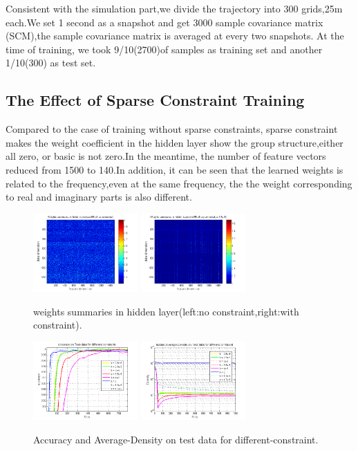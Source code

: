 Consistent with the simulation part,we divide the trajectory into 300 grids,25m each.We set 1 second as a snapshot and get 3000 sample covariance matrix (SCM),the sample covariance matrix is averaged at every two snapshots.
At the time of training, we took 9/10(2700)of samples as training set and another 1/10(300) as test set.

\subsection{The Effect of Sparse Constraint Training}
Compared to the case of training without sparse constraints, sparse constraint makes the weight coefficient in the hidden layer show the group structure,either all zero, or basic is not zero.In the meantime, the number of feature vectors reduced from 1500 to 140.In addition, it can be seen that the learned weights is related to the frequency,even at the same frequency, the the weight corresponding to real and imaginary parts is also different.

\begin{figure}
\includegraphics[width=4cm,height=3cm]{figure/Weights_summaries_in_hidden_laye_swell_exp}
\includegraphics[width=4cm,height=3cm]{figure/Weights_summaries_in_hidden_laye_swell_exp_sc_3dot5_e_neg_5}
\caption{weights summaries in hidden layer(left:no constraint,right:with constraint).}
\end{figure}

\begin{figure}
\includegraphics[width=4cm,height=3cm]{figure/Accuracy_on_Test_data_for_different_constraint_exp}
\includegraphics[width=4cm,height=3cm]{figure/hidden-Average-Density-on-Test-data-for-different-constraint_exp}
\caption{Accuracy and Average-Density on test data for different-constraint.}
\end{figure}

